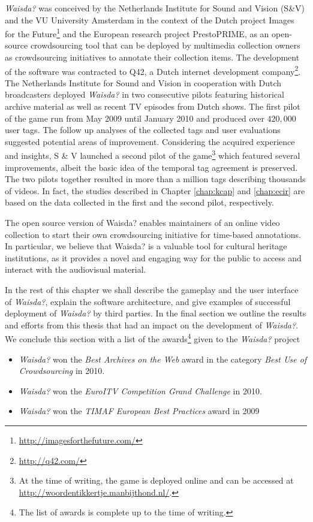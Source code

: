 \textit{Waisda?} was conceived by the Netherlands Institute for Sound and Vision (S\&V) and the VU University Amsterdam in the context of the Dutch project Images for the Future\footnote{\url{http://imagesforthefuture.com/}} and the European research project PrestoPRIME, as an open-source crowdsourcing tool that can be deployed by multimedia collection owners as crowdsourcing initiatives to annotate their collection items. The development of the software was contracted to Q42, a Dutch internet development company\footnote{\url{http://q42.com/}}. The Netherlands Institute for Sound and Vision in cooperation with Dutch broadcasters deployed \textit{Waisda?} in two consecutive pilots featuring historical archive material as well as recent TV episodes from Dutch shows. The first pilot of the game run from May 2009 until January 2010 and produced over $420,000$ user tags. The follow up analyses of the collected tags \cite{Annelies,ecir} and user evaluations suggested potential areas of improvement. Considering the acquired experience and insights, S \& V launched a second pilot of the game\footnote{At the time of writing, the game is deployed online and can be accessed at \url{http://woordentikkertje.manbijthond.nl/}.} which featured several improvements, albeit the basic idea of the temporal tag agreement is preserved. The two pilots together resulted in more than a million tags describing thousands of videos. In fact, the studies described in Chapter \ref{chap:kcap} and \ref{chap:ecir} are based on the data collected in the first and the second pilot, respectively.

The open source version of Waisda? enables maintainers of an online video collection to start their own crowdsourcing initiative for time-based annotations. In particular, we believe that Waisda? is a valuable tool for cultural heritage institutions, as it provides a novel and engaging way for the public to access and interact with the audiovisual material.

In the rest of this chapter we shall describe the gameplay and the user interface of \textit{Waisda?}, explain the software architecture, and give examples of successful deployment of \textit{Waisda?} by third parties. In the final section we outline the results and efforts from this thesis that had an impact on the development of \textit{Waisda?}.
We conclude this section with a list of the awards\footnote{The list of awards is complete up to the time of writing.} given to the \textit{Waisda?} project 
\begin{itemize}
\item \textit{Waisda?} won the \textit{Best Archives on the Web} award in the category \textit{Best Use of Crowdsourcing} in 2010.
\item \textit{Waisda?} won the \textit{EuroITV Competition Grand Challenge} in 2010.
\item \textit{Waisda?} won the \textit{TIMAF European Best Practices} award in 2009
\end{itemize}


